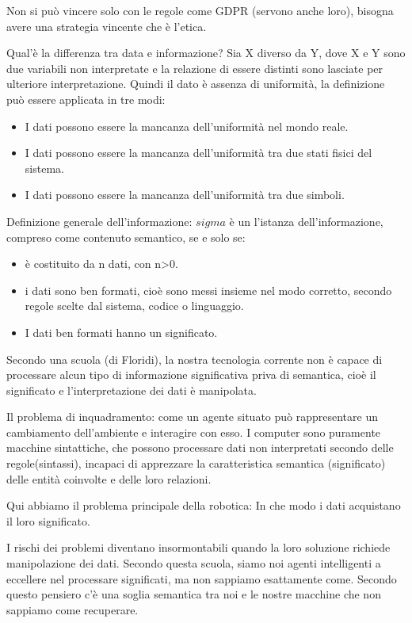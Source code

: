 \documentclass[a4page, 11pt]{article}
\begin{document}
Non si può vincere solo con le regole come GDPR (servono anche loro),
bisogna avere una strategia vincente che è l'etica.

Qual'è la differenza tra data e informazione? Sia X diverso da Y, dove X
e Y sono due variabili non interpretate e la relazione di essere
distinti sono lasciate per ulteriore interpretazione. Quindi il dato è
assenza di uniformità, la definizione può essere applicata in tre modi:

\begin{itemize}
	 
	\item
	I dati possono essere la mancanza dell'uniformità nel mondo reale.
	\item
	I dati possono essere la mancanza dell'uniformità tra due stati fisici
	del sistema.
	\item
	I dati possono essere la mancanza dell'uniformità tra due simboli.
\end{itemize}

Definizione generale dell'informazione: $sigma$ è un l'istanza
dell'informazione, compreso come contenuto semantico, se e solo se:

\begin{itemize}
	 
	\item
	è costituito da n dati, con n\textgreater{}0.
	\item
	i dati sono ben formati, cioè sono messi insieme nel modo corretto,
	secondo regole scelte dal sistema, codice o linguaggio.
	\item
	I dati ben formati hanno un significato.
\end{itemize}

Secondo una scuola (di Floridi), la nostra tecnologia corrente non è
capace di processare alcun tipo di informazione significativa priva di
semantica, cioè il significato e l'interpretazione dei dati è
manipolata.

Il problema di inquadramento: come un agente situato può rappresentare
un cambiamento dell'ambiente e interagire con esso. I computer sono
puramente macchine sintattiche, che possono processare dati non
interpretati secondo delle regole(sintassi), incapaci di apprezzare la
caratteristica semantica (significato) delle entità coinvolte e delle
loro relazioni.

Qui abbiamo il problema principale della robotica: In che modo i dati
acquistano il loro significato.

I rischi dei problemi diventano insormontabili quando la loro soluzione
richiede manipolazione dei dati. Secondo questa scuola, siamo noi agenti
intelligenti a eccellere nel processare significati, ma non sappiamo
esattamente come. Secondo questo pensiero c'è una soglia semantica tra
noi e le nostre macchine che non sappiamo come recuperare.
\end{document}
